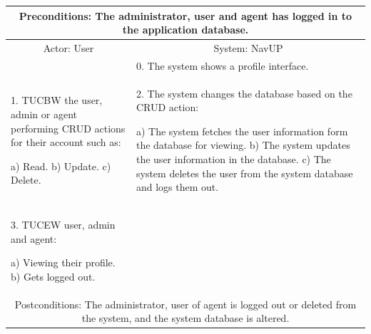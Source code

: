 \documentclass{article}
\begin{document}
       		 \begin{tabular}{|p{6cm}|p{6cm}|}
       		 \hline
       		\multicolumn{2}{c}{\parbox{12cm}{\vspace{2mm} Preconditions: The administrator, user and agent has logged in to the application database.\vspace{2mm}}} \\
       		 \hline
       		\multicolumn{1}{c}{Actor: User} & \multicolumn{1}{c}{ System: NavUP} \\
        		\hline
       		 &0.	The system shows a profile interface.\\
       		 \hline
       		1.	TUCBW the user, admin or agent performing CRUD actions for their account such as:

a)	Read.
b)	Update.
c)	Delete.
 & 2.	The system changes the database based on the CRUD action:

a)	The system fetches the user information form the database for viewing.
b)	The system updates the user information in the database.
c)	The system deletes the user from the system database and logs them out.

\\
        		\hline
       		3.	TUCEW user, admin and agent:

a)	Viewing their profile.
b)	Gets logged out.
&\\
       		 \hline
        		\multicolumn{2}{c}{\parbox{12cm}{\vspace{2mm}Postconditions: The administrator, user of agent is logged out or deleted from the system, and the system database is altered.\vspace{2mm}} } \\
        		\hline
        \end{tabular} 
        \endgroup
        
\end{document}
